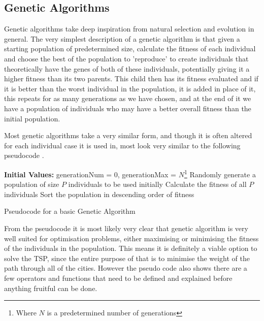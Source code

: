 \documentclass[11pt,a4paper,titlepage]{article}
\begin{document}
\subsection{Genetic Algorithms}
Genetic algorithms take deep inspiration from natural selection and evolution in general. The very simplest description of a genetic algorithm is that given a starting population of predetermined size, calculate the fitness of each individual and choose the best of the population to 'reproduce' to create individuals that theoretically have the genes of both of these individuals, potentially giving it a higher fitness than its two parents. This child then has its fitness evaluated and if it is better than the worst individual in the population, it is added in place of it, this repeats for as many generations as we have chosen, and at the end of it we have a population of individuals who may have a better overall fitness than the initial population.

Most genetic algorithms take a very similar form, and though it is often altered for each individual case it is used in, most look very similar to the following pseudocode \cite{GAIntro}.
\clearpage

\begin{algorithm}[H]
\SetAlgoLined
\textbf{Initial Values:} generationNum = 0, generationMax = $N$\footnote{Where $N$ is a predetermined number of generations}\;
Randomly generate a population of size $P$ individuals to be used initially\;
Calculate the fitness of all $P$ individuals\;
Sort the population in descending order of fitness\;
\caption{Pseudocode for a basic Genetic Algorithm}
\end{algorithm}

From the pseudocode it is most likely very clear that genetic algorithm is very well suited for optimisation problems, either maximising or minimising the fitness of the individuals in the population. This means it is definitely a viable option to solve the TSP, since the entire purpose of that is to minimise the weight of the path through all of the cities. However the pseudo code also shows there are a few operators and functions that need to be defined and explained before anything fruitful can be done.
\end{document}
